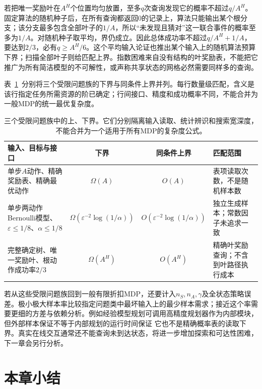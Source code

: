 若把唯一奖励叶在$A^H$个位置均匀放置，至多$q$次查询发现它的概率不超过$q/A^H$。固定算法的随机种子后，在所有查询都返回0的记录上，算法只能输出某个根分支；该分支最多包含全部叶子的$1/A$，所以“未发现且猜对”这一联合事件的概率至多为$1/A$。对随机种子取平均，界仍成立。因此总体成功率不超过$q/A^H+1/A$，要达到$2/3$，必有$q\geq A^H/6$。这个平均输入论证也推出某个输入上的随机算法预算下界；扫描全部叶子则给匹配上界。指数困难来自没有结构的叶奖励表，不能把它推广为所有简洁模型的不可解性，或声称共享状态的网格必然需要同样多的查询。

表~\ref{tab:rl-planning-bounds}~分别将三个受限问题族的下界与同条件上界并列。每行数量级匹配，含义是该行指定任务所需资源的阶已确定；行间接口、精度和成功概率不同，不能合并为一般MDP的统一最优复杂度。

\begin{table}[htbp]
 \centering
 \small
 \begin{tabularx}{\linewidth}{@{}>{\raggedright\arraybackslash}Xcc>{\raggedright\arraybackslash}X@{}}
  \toprule
  输入、目标与接口 & 下界 & 同条件上界 & 匹配范围\\
  \midrule
  单步$A$动作、精确奖励表、精确最优动作 & $\Omega(A)$ & $O(A)$ & 表项读取次数，不是随机样本数\\
  单步两动作Bernoulli模型、$\varepsilon\leq1/8$、$\alpha\leq1/8$ & $\Omega(\varepsilon^{-2}\log(1/\alpha))$ & $O(\varepsilon^{-2}\log(1/\alpha))$ & 独立生成样本；常数因子未追求一致\\
  完整确定树、唯一奖励叶、根动作成功率$2/3$ & $\Omega(A^H)$ & $O(A^H)$ & 精确叶奖励查询；不含到叶路径执行成本\\
  \bottomrule
 \end{tabularx}
 \caption{三个受限问题族中的上、下界。它们分别隔离输入读取、统计辨识和搜索宽深度，不能合并为一个适用于所有MDP的复杂度公式。}
 \label{tab:rl-planning-bounds}
\end{table}

若从这些受限问题族回到一般有限折扣MDP，还要计入$n_S,n_A,\gamma$及全状态策略误差。极小极大样本率比较指定问题类中最坏输入上的最少样本需求；接近这个率需要更细的方差与依赖分析。例如经验模型规划可调用高精度规划器作为内部模块，但外部样本保证不等于内部规划的运行时间保证
它也不是精确概率表的读取下界。真实在线交互通常还不能查询未到达状态，将进一步增加探索和可达性困难，下一章会另行分析。

\section{本章小结}
\label{sec:rl-planning-summary}

